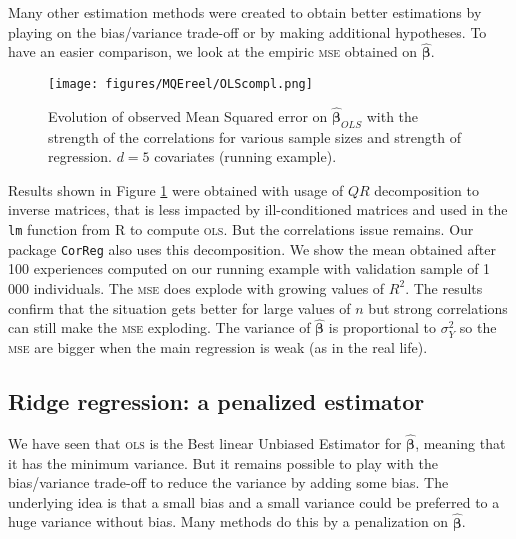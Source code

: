 \documentclass[12pt,a4paper]{report}
\begin{document}
	
	
	Many other estimation methods were created to obtain better estimations by playing on the bias/variance trade-off or by making additional hypotheses.
	To have an easier comparison, we look at the empiric \textsc{mse} obtained on $\hat{\boldsymbol{\beta}}$.
		\\
	
	 \begin{figure}
	 \centering
	  \texttt{[image: figures/MQEreel/OLScompl.png]}
	  \caption{Evolution of observed Mean Squared error on $\hat{\boldsymbol{\beta}}_{OLS}$ with the strength of the correlations for various sample sizes and strength of regression. $d=5$ covariates (running example). } \label{MQEOLScompl}
	\end{figure}	
	Results shown in Figure \ref{MQEOLScompl} were obtained with usage of $QR$ decomposition to inverse matrices, that is less impacted by ill-conditioned matrices \cite{bulirsch2002introduction} and used in the {\tt lm} function from R to compute \textsc{ols}. But the correlations issue remains. Our package {\tt CorReg} also uses this decomposition.
	 We show the mean obtained after 100 experiences computed on our running example with validation sample of 1 000 individuals. The \textsc{mse} does explode with growing values of $R^2$. The results confirm that the situation gets better for large values of $n$ but strong correlations can still make the \textsc{mse} exploding. The variance of $\hat{\boldsymbol{\beta}}$ is proportional to $\sigma_Y^2$ so the \textsc{mse} are bigger when the main regression is weak (as in the real life).
	\\
	
		 \FloatBarrier
		

	\subsection{Ridge regression: a penalized estimator}
	
	We have seen that \textsc{ols} is the Best linear Unbiased Estimator for $\hat{\boldsymbol{\beta}}$, meaning that it has the minimum variance. But it remains possible to play with the bias/variance trade-off to reduce the variance by adding some bias. The underlying idea is that a small bias and a small variance could be preferred to a huge variance without bias. Many methods do this by a penalization on  $\hat{\boldsymbol{\beta}}$.  %
\end{document}
